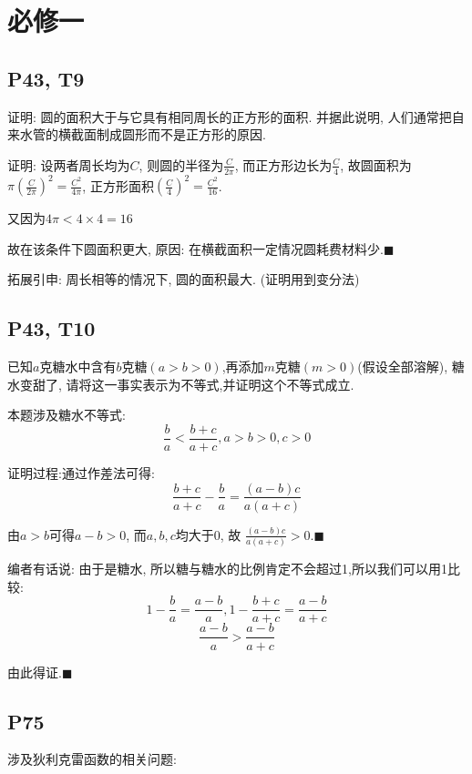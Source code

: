 \documentclass{book}
\begin{document}
    \chapter{必修一}
    \section{\textcolor[rgb]{0.11,0.65,0.52}{P43, T9}}
    \begin{boxB}
        证明: 圆的面积大于与它具有相同周长的正方形的面积. 并据此说明, 人们通常把自来水管的横截面制成圆形而不是正方形的原因.
    \end{boxB}
    \doublespacing
    证明: 设两者周长均为$C$, 则圆的半径为$\displaystyle \frac{C}{2\pi}$, 而正方形边长为$\displaystyle \frac{C}{4}$, 故圆面积为$\displaystyle \pi(\frac{C}{2\pi})^2=\frac{C^2}{4\pi}$, 正方形面积$\displaystyle (\frac{C}{4})^2=\frac{C^2}{16}$.

    又因为$\displaystyle 4\pi < 4 \times 4 = 16$

    故在该条件下圆面积更大, 原因: 在横截面积一定情况圆耗费材料少.$\blacksquare$

    \textcolor[rgb]{0.38,0.11,0.2}{拓展引申: 周长相等的情况下, 圆的面积最大. (证明用到变分法)}
    \section{\textcolor[rgb]{0.11,0.65,0.52}{P43, T10}}
    \begin{boxB}
        已知$a$克糖水中含有$b$克糖$(a>b>0)$,再添加$m$克糖$(m>0)$(假设全部溶解), 糖水变甜了, 请将这一事实表示为不等式,并证明这个不等式成立.
    \end{boxB}

    本题涉及\textcolor[rgb]{0.38,0.11,0.2}{糖水不等式}:
    $$
    \frac{b}{a} < \frac{b+c}{a+c}, a>b>0, c>0
    $$

    证明过程:通过\textcolor[rgb]{0.75,0.17,0.22}{作差法}可得:
    $$
    \frac{b+c}{a+c} - \frac{b}{a} = \frac{(a-b)c}{a(a+c)}
    $$

    由$a>b$可得$a-b>0$, 而$a,b,c$均大于$0$, 故 $\displaystyle \frac{(a-b)c}{a(a+c)}>0. \blacksquare$

    编者有话说: 由于是糖水, 所以糖与糖水的比例肯定不会超过1,所以我们可以用1比较:
    $$
    1-\frac{b}{a}=\frac{a-b}{a},1-\frac{b+c}{a+c}=\frac{a-b}{a+c}
    $$
    $$
    \frac{a-b}{a}>\frac{a-b}{a+c}
    $$

    由此得证.$\blacksquare$

    \section{\textcolor[rgb]{0.11,0.65,0.52}{P75}}
    涉及\textcolor[rgb]{0.38,0.11,0.2}{狄利克雷函数}的相关问题:
\end{document}
